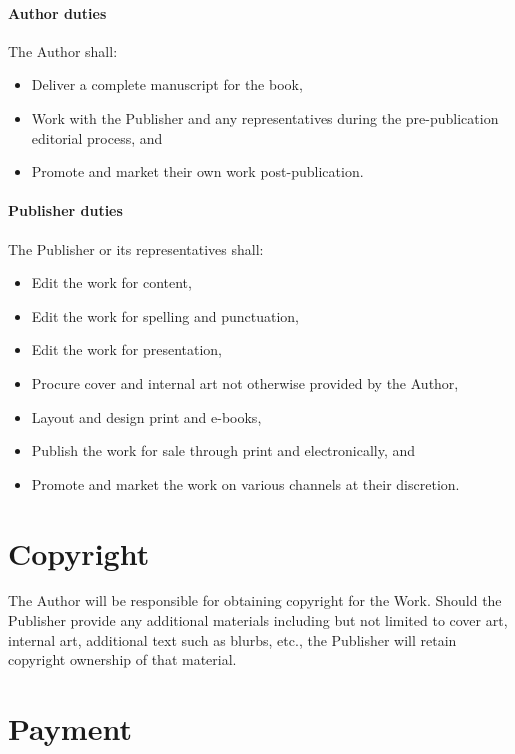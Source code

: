 \documentclass[12pt,letterpaper,oneside]{article}
\begin{document}
\paragraph{Author duties}

The Author shall:

\begin{itemize}
    \item Deliver a complete manuscript for the book,
    \item Work with the Publisher and any representatives during the pre-publication editorial process, and
    \item Promote and market their own work post-publication.
\end{itemize}

\paragraph{Publisher duties}

The Publisher or its representatives shall:

\begin{itemize}
    \item Edit the work for content,
    \item Edit the work for spelling and punctuation,
    \item Edit the work for presentation,
    \item Procure cover and internal art not otherwise provided by the Author,
    \item Layout and design print and e-books,
    \item Publish the work for sale through print and electronically, and
    \item Promote and market the work on various channels at their discretion.
\end{itemize}

\section{Copyright}

The Author will be responsible for obtaining copyright for the Work. Should the Publisher provide any additional materials including but not limited to cover art, internal art, additional text such as blurbs, etc., the Publisher will retain copyright ownership of that material.

\section{Payment}
\end{document}
